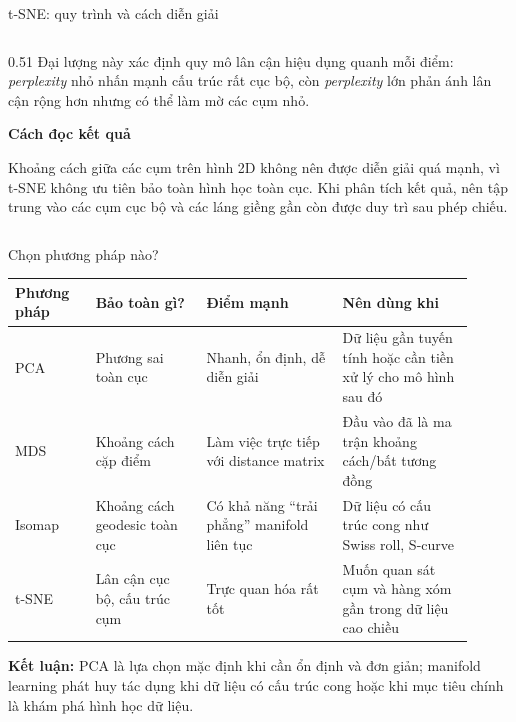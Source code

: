 \begin{frame}[shrink=4]{t-SNE: quy trình và cách diễn giải}
\begin{columns}[T,onlytextwidth]
\begin{column}{0.51\textwidth}
            Đại lượng này xác định quy mô lân cận hiệu dụng quanh mỗi điểm: \textit{perplexity} nhỏ nhấn mạnh cấu trúc rất cục bộ, còn \textit{perplexity} lớn phản ánh lân cận rộng hơn nhưng có thể làm mờ các cụm nhỏ.

            \vspace{0.1cm}
            {\bfseries Cách đọc kết quả}

            Khoảng cách giữa các cụm trên hình 2D không nên được diễn giải quá mạnh, vì t-SNE không ưu tiên bảo toàn hình học toàn cục. Khi phân tích kết quả, nên tập trung vào các cụm cục bộ và các láng giềng gần còn được duy trì sau phép chiếu.
        \end{column}
    \end{columns}

    \hfill{\scriptsize \cite{maaten2008visualizing,duchesnay2021statsml}}
\end{frame}

\begin{frame}[shrink=10]{Chọn phương pháp nào?}
    \footnotesize
    \renewcommand{\arraystretch}{1.18}
    \begin{tabular}{p{0.16\linewidth} p{0.22\linewidth} p{0.27\linewidth} p{0.26\linewidth}}
        \toprule
        \textbf{Phương pháp} & \textbf{Bảo toàn gì?} & \textbf{Điểm mạnh} & \textbf{Nên dùng khi} \\
        \midrule
        PCA & Phương sai toàn cục & Nhanh, ổn định, dễ diễn giải & Dữ liệu gần tuyến tính hoặc cần tiền xử lý cho mô hình sau đó \\
        \addlinespace
        MDS & Khoảng cách cặp điểm & Làm việc trực tiếp với distance matrix & Đầu vào đã là ma trận khoảng cách/bất tương đồng \\
        \addlinespace
        Isomap & Khoảng cách geodesic toàn cục & Có khả năng ``trải phẳng'' manifold liên tục & Dữ liệu có cấu trúc cong như Swiss roll, S-curve \\
        \addlinespace
        t-SNE & Lân cận cục bộ, cấu trúc cụm & Trực quan hóa rất tốt & Muốn quan sát cụm và hàng xóm gần trong dữ liệu cao chiều \\
        \bottomrule
    \end{tabular}

    \vspace{0.25cm}
    \begin{center}
        \textcolor{your_color}{\textbf{Kết luận:}} PCA là lựa chọn mặc định khi cần ổn định và đơn giản; manifold learning phát huy tác dụng khi dữ liệu có cấu trúc cong hoặc khi mục tiêu chính là khám phá hình học dữ liệu.
    \end{center}
\end{frame}
